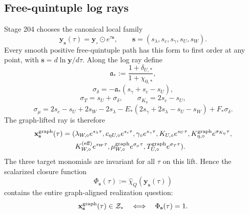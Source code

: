 \subsection{Free-quintuple log rays}
\label{subsec:part06-free-quintuple-log-rays}

Stage 204 chooses the canonical local family
\begin{equation}
\label{eq:part06-log-ray}
\mathbf y_{\mathbf s}(\tau)=\mathbf y_\circ\odot e^{\tau\mathbf s},
\qquad
\mathbf s=(s_\lambda,s_c,s_\gamma,s_U,s_W).
\end{equation}
Every smooth positive free-quintuple path has this form to first order at any point, with \(\mathbf s=d\ln\mathbf y/d\tau\).  Along the log ray define
\begin{equation}
\label{eq:part06-a-star}
\mathfrak a_*:=\frac{1+\delta_{U,*}}{1+\chi_{0,*}},
\end{equation}
\begin{equation}
\label{eq:part06-sigma-delta}
\sigma_\delta=-\mathfrak a_*(s_\gamma+s_c-s_U),
\end{equation}
\begin{equation}
\label{eq:part06-sigma-T-K}
\sigma_T=s_U+\sigma_\delta,
\qquad
\sigma_{K_\eta}=2s_c-s_U,
\end{equation}
\begin{equation}
\label{eq:part06-sigma-mu}
\sigma_\mu
=2s_c-s_U+2s_W-2s_\lambda
-E_*(2s_\gamma+2s_\lambda-s_U-s_W)
+F_*\sigma_\delta.
\end{equation}
The graph-lifted ray is therefore
\begin{equation}
\label{eq:part06-graph-lifted-ray}
\begin{aligned}
\mathbf x_{\mathbf s}^{\rm graph}(\tau)=
(&\lambda_{W,\circ}e^{s_\lambda\tau},
 c_{\eta U,\circ}e^{s_c\tau},
 \gamma_\circ e^{s_\gamma\tau},
 K_{U,\circ}e^{s_U\tau},
 K_{\eta,\circ}^{\rm graph}e^{\sigma_{K_\eta}\tau},\\
&K_{W,\circ}^{(\rm eff)}e^{s_W\tau},
 \mu_{W,\circ}^{\rm graph}e^{\sigma_\mu\tau},
 T_{U,\circ}^{\rm graph}e^{\sigma_T\tau}).
\end{aligned}
\end{equation}
The three target monomials are invariant for all \(\tau\) on this lift.  Hence the scalarized closure function
\begin{equation}
\label{eq:part06-Phi-ray-def}
\Phi_{\mathbf s}(\tau):=
\widehat\chi_Q(\mathbf y_{\mathbf s}(\tau))
\end{equation}
contains the entire graph-aligned realization question:
\begin{equation}
\label{eq:part06-ray-closure}
\mathbf x_{\mathbf s}^{\rm graph}(\tau)\in\mathcal Z_*
\quad\Longleftrightarrow\quad
\Phi_{\mathbf s}(\tau)=1.
\end{equation}

